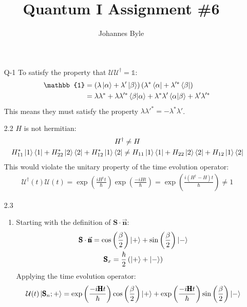 \documentclass[12pt]{article}
\title{Quantum I Assignment \#6}
\author{Johannes Byle}
\newcommand{\OP}[1]{\pmb{\text{#1}}}
\newcommand{\Fop}[1]{\mathcal{#1}}
\begin{document}
  \maketitle
  \begin{enumerate}
    \item[Q-1] To satisfy the property that $\Fop{U}\Fop{U}^{\dagger}=\mathbb{1}$:
    \begin{align*}
      \mathbb{1}&=\left(\lambda\ket{\alpha}+\lambda'\ket{\beta}\right)\left(\lambda^*\bra{\alpha}+\lambda'^*\bra{\beta}\right)\\
      &= \lambda\lambda^* +\lambda\lambda'^*\braket{\beta|\alpha}+\lambda^*\lambda'\braket{\alpha|\beta}+\lambda'\lambda'^*
    \end{align*}
    This means they must satisfy the property $\lambda\lambda'^*=-\lambda^*\lambda'$.
    \item[2.2] $H$ is not hermitian:
    \begin{gather*}
      H^{\dagger}\neq H\\
      H_{11}^*\ket{1}\bra{1}+H_{22}^*\ket{2}\bra{2}+H_{12}^*\ket{1}\bra{2}\neq H_{11}\ket{1}\bra{1}+H_{22}\ket{2}\bra{2}+H_{12}\ket{1}\bra{2}
    \end{gather*}
    This would violate the unitary property of the time evolution operator:
    \begin{gather*}
      \mathcal{U}^{\dagger}(t)\mathcal{U}(t)=\exp\left( \frac{iH^{\dagger}t}{\hbar} \right)\exp\left( \frac{-iH t}{\hbar} \right)=\exp\left( \frac{i(H^{\dagger}-H) t}{\hbar} \right)\neq 1
    \end{gather*}
    \item[2.3]
    \begin{enumerate}
      \item Starting with the definition of $\OP{S}\cdot\vec{\OP{n}}$:
      \begin{gather*}
        \OP{S}\cdot\vec{\OP{n}}=\cos\left( \frac{\beta}{2} \right)\ket{+}+\sin\left( \frac{\beta}{2} \right)\ket{-}\\
        \OP{S}_x=\frac{\hbar}{2}\left( \ket{+}+\ket{-} \right)\\
      \end{gather*}
      Applying the time evolution operator:
      \begin{gather*}
        \Fop{U}(t)\ket{\OP{S}_n;+}=\exp\left( \frac{-i\OP{H}t}{\hbar} \right)\cos\left( \frac{\beta}{2} \right)\ket{+}+\exp\left( \frac{-i\OP{H}t}{\hbar} \right)\sin\left( \frac{\beta}{2} \right)\ket{-}\\

\end{gather*}
\end{enumerate}
\end{enumerate}
\end{document}
